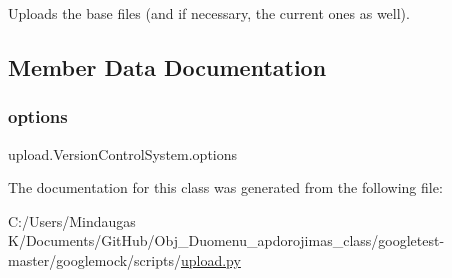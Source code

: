 \begin{DoxyVerb}Uploads the base files (and if necessary, the current ones as well).\end{DoxyVerb}
 

\subsection{Member Data Documentation}
\mbox{\label{classupload_1_1_version_control_system_a4d57d043bc408887b94269fe4cea9556}} 
\subsubsection{\texorpdfstring{options}{options}}
{\footnotesize\ttfamily upload.\+Version\+Control\+System.\+options}



The documentation for this class was generated from the following file\+:\begin{DoxyCompactItemize}
\item 
C\+:/\+Users/\+Mindaugas K/\+Documents/\+Git\+Hub/\+Obj\+\_\+\+Duomenu\+\_\+apdorojimas\+\_\+class/googletest-\/master/googlemock/scripts/\mbox{\hyperlink{googletest-master_2googlemock_2scripts_2upload_8py}{upload.\+py}}\end{DoxyCompactItemize}
